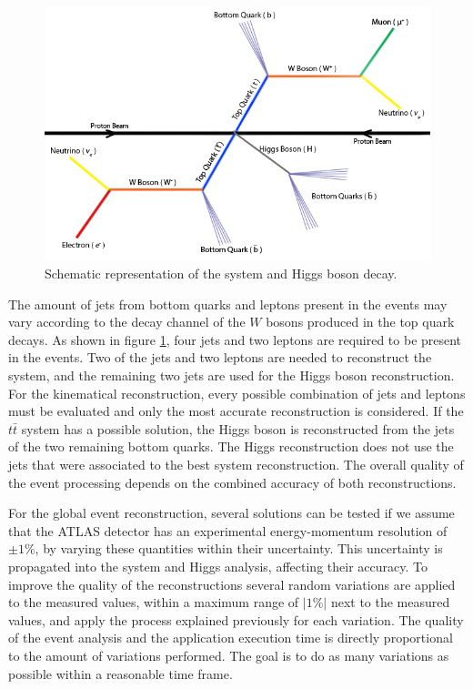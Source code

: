 \begin{figure}[!htp]
	\begin{center}
		\includegraphics[scale=0.45]{imgs/ttbar_higgs.png}
		\caption{Schematic representation of the \ttbar system and Higgs boson decay.}
		\label{fig:ttbar}
	\end{center}
\end{figure}

The amount of jets from bottom quarks and leptons present in the events may vary according to the decay channel of the $W$ bosons produced in the top quark decays. As shown in figure \ref{fig:ttbar}, four jets and two leptons are required to be present in the events. Two of the jets and two leptons are needed to reconstruct the \ttbar system, and the remaining two jets are used for the Higgs boson reconstruction. For the kinematical reconstruction, every possible combination of jets and leptons must be evaluated and only the most accurate reconstruction is considered. If the $t\bar{t}$ system has a possible solution, the Higgs boson is reconstructed from the jets of the two remaining bottom quarks. The Higgs reconstruction does not use the jets that were associated to the best \ttbar system reconstruction. The overall quality of the event processing depends on the combined accuracy of both reconstructions.

For the global event reconstruction, several solutions can be tested if we assume that the ATLAS detector has an experimental energy-momentum resolution of $\pm1\%$, by varying these quantities within their uncertainty. This uncertainty is propagated into the \ttbar system and Higgs analysis, affecting their accuracy. To improve the quality of the reconstructions several random variations are applied to the measured values, within a maximum range of $|1\%|$ next to the measured values, and apply the process explained previously for each variation. The quality of the event analysis and the application execution time is directly proportional to the amount of variations performed. The goal is to do as many variations as possible within a reasonable time frame.

